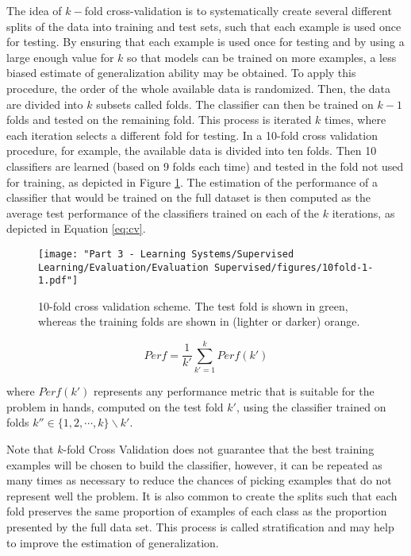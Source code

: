 The idea of $k-$fold cross-validation is to systematically create several different splits of the data into training and test sets, such that each example is used once for testing. By ensuring that each example is used once for testing and by using a large enough value for $k$ so that models can be trained on more examples, a less biased estimate of generalization ability may be obtained. To apply this procedure, the order of the whole available data is randomized. Then, the data are divided into $k$ subsets called folds. The classifier can then be trained on $k-1$ folds and tested on the remaining fold. This process is iterated $k$ times, where each iteration selects a different fold for testing. In a 10-fold cross validation procedure, for example, the available data is divided into ten folds. Then 10 classifiers are learned (based on 9 folds each time) and tested in the fold not used for training, as depicted in Figure \ref{fig:10fold}. The estimation of the performance of a classifier that would be trained on the full dataset is then computed as the average test performance of the classifiers trained on each of the $k$ iterations, as depicted in Equation \ref{eq:cv}. 

\begin{figure}[h]
    \centering
    \texttt{[image: "Part 3 - Learning Systems/Supervised Learning/Evaluation/Evaluation Supervised/figures/10fold-1-1.pdf"]}
    \caption{10-fold cross validation scheme. The test fold is shown in green, whereas the training folds are shown in (lighter or darker) orange.}
    \label{fig:10fold}
\end{figure}

\begin{equation}
    Perf = \frac{1}{k'}\sum_{k' = 1}^{k} Perf(k')
    \label{eq:cv}
\end{equation}

\noindent where $Perf(k')$ represents any performance metric that is suitable for the problem in hands, computed on the test fold $k'$, using the classifier trained on folds $k'' \in \{1,2,\cdots,k\} \backslash k'$.






Note that $k$-fold Cross Validation does not guarantee that the best training examples will be chosen to build the classifier, however, it can be repeated as many times as necessary to reduce the chances of picking examples that do not represent well the problem.  It is also common to create the splits such that each fold preserves the same proportion of examples of each class as the proportion presented by the full data set. This process is called stratification and may help to improve the estimation of generalization.   

